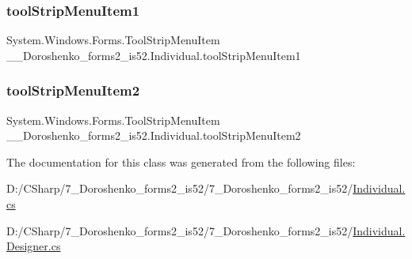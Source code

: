 \subsubsection{\texorpdfstring{tool\+Strip\+Menu\+Item1}{toolStripMenuItem1}}
{\footnotesize\ttfamily System.\+Windows.\+Forms.\+Tool\+Strip\+Menu\+Item \+\_\+\_\+\+Doroshenko\+\_\+forms2\+\_\+is52.\+Individual.\+tool\+Strip\+Menu\+Item1\hspace{0.3cm}{\ttfamily [private]}}

\hypertarget{class__7___doroshenko__forms2__is52_1_1_individual_aac6217256c1c0ec2ec08bb8452b985fc}{}\label{class__7___doroshenko__forms2__is52_1_1_individual_aac6217256c1c0ec2ec08bb8452b985fc} 
\subsubsection{\texorpdfstring{tool\+Strip\+Menu\+Item2}{toolStripMenuItem2}}
{\footnotesize\ttfamily System.\+Windows.\+Forms.\+Tool\+Strip\+Menu\+Item \+\_\+\_\+\+Doroshenko\+\_\+forms2\+\_\+is52.\+Individual.\+tool\+Strip\+Menu\+Item2\hspace{0.3cm}{\ttfamily [private]}}



The documentation for this class was generated from the following files\+:\begin{DoxyCompactItemize}
\item 
D\+:/\+C\+Sharp/7\+\_\+\+Doroshenko\+\_\+forms2\+\_\+is52/7\+\_\+\+Doroshenko\+\_\+forms2\+\_\+is52/\hyperlink{_individual_8cs}{Individual.\+cs}\item 
D\+:/\+C\+Sharp/7\+\_\+\+Doroshenko\+\_\+forms2\+\_\+is52/7\+\_\+\+Doroshenko\+\_\+forms2\+\_\+is52/\hyperlink{_individual_8_designer_8cs}{Individual.\+Designer.\+cs}\end{DoxyCompactItemize}
